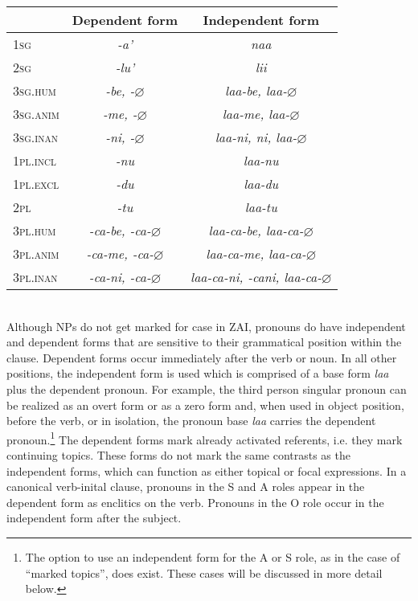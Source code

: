 \begin{tabular}{| l | c | c |}\hline
 & Dependent form & Independent form \\
\hline
1\textsc{sg} & \emph{-a'} & \emph{naa} \\
\hline
2\textsc{sg} & \emph{-lu'} & \emph{lii} \\
\hline
3\textsc{sg.hum} & \emph{-be, -$\varnothing$} & \emph{laa-be, laa-$\varnothing$} \\
\hline
3\textsc{sg.anim} & \emph{-me, -$\varnothing$} & \emph{laa-me, laa-$\varnothing$} \\
\hline
3\textsc{sg.inan} &  \emph{-ni, -$\varnothing$} & \emph{laa-ni, ni, laa-$\varnothing$} \\
\hline
1\textsc{pl.incl} & \emph{-nu} & \emph {laa-nu} \\
\hline
1\textsc{pl.excl} & \emph{-du} & \emph {laa-du} \\
\hline
2\textsc{pl} & \emph{-tu} & \emph {laa-tu} \\
\hline
3\textsc{pl.hum} &  \emph{-ca-be, -ca-$\varnothing$} & \emph {laa-ca-be, laa-ca-$\varnothing$} \\
\hline
3\textsc{pl.anim} &\emph{-ca-me, -ca-$\varnothing$} & \emph{laa-ca-me, laa-ca-$\varnothing$} \\
\hline
3\textsc{pl.inan} &  \emph{-ca-ni, -ca-$\varnothing$} & \emph{laa-ca-ni, -cani, laa-ca-$\varnothing$} \\
\hline
\end{tabular}\\
\z
Although NPs do not get marked for case in ZAI, pronouns do have independent and dependent forms that are sensitive to their grammatical position within the clause. Dependent forms occur immediately after the verb or noun. In all other positions, the independent form is used which is comprised of a base form \textit{laa} plus the dependent pronoun. For example, the third person singular pronoun can be realized as an overt form or as a zero form and, when used in object position, before the verb, or in isolation, the pronoun base \textit{laa} carries the dependent pronoun.\footnote{The option to use an independent form for the A or S role, as in the case of ``marked topics'', does exist. These cases will be discussed in more detail below.} The dependent forms mark already activated referents, i.e. they mark continuing topics. These forms do not mark the same contrasts as the independent forms, which can function as either topical or focal expressions. In a canonical verb-inital clause, pronouns in the S and A roles appear in the dependent form as enclitics on the verb. Pronouns in the O role occur in the independent form after the subject.

